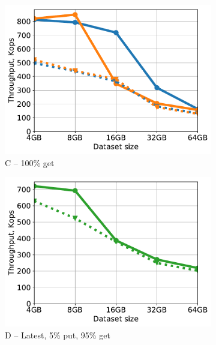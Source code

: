 \begin{figure}[tb]
\begin{subfigure}{0.49\columnwidth}
\includegraphics[width=\textwidth]{figs/Workload_C_line.pdf}
\caption{C -- 100\% get}
\label{fig:throughput:c}
\end{subfigure}
\begin{subfigure}{0.49\columnwidth}
\includegraphics[width=\textwidth]{figs/Workload_D_line.pdf}
\caption{D -- Latest, 5\% put, 95\% get}
\label{fig:throughput:d}
\end{subfigure}
\begin{subfigure}{0.49\columnwidth}

\end{subfigure}
\end{figure}
